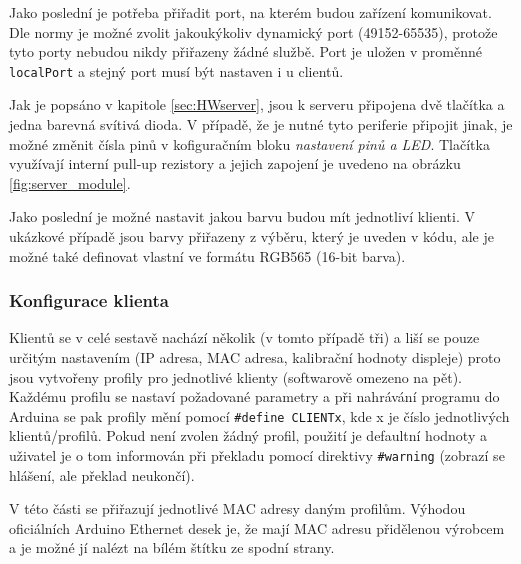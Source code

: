 Jako poslední je potřeba přiřadit port, na kterém budou zařízení komunikovat. Dle normy \cite{norm_RFC6335} je možné zvolit jakoukýkoliv dynamický port (49152-65535), protože tyto porty nebudou nikdy přiřazeny žádné službě. Port je uložen v proměnné \texttt{localPort} a stejný port musí být nastaven i u clientů.


Jak je popsáno v kapitole \ref{sec:HWserver}, jsou k serveru připojena dvě tlačítka a jedna barevná svítivá dioda. V případě, že je nutné tyto periferie připojit jinak, je možné změnit čísla pinů v kofiguračním bloku \textit{nastavení pinů a LED}. Tlačítka využívají interní pull-up rezistory a jejich zapojení je uvedeno na obrázku \ref{fig:server_module}.


Jako poslední je možné nastavit jakou barvu budou mít jednotliví klienti. V ukázkové případě jsou barvy přiřazeny z výběru, který je uveden v kódu, ale je možné také definovat vlastní ve formátu RGB565 (16-bit barva).


\subsubsection{Konfigurace klienta}
\label{sec:client-nastaveni}
Klientů se v celé sestavě nachází několik (v tomto případě tři) a liší se pouze určitým nastavením (IP adresa, MAC adresa, kalibrační hodnoty displeje) proto jsou vytvořeny profily pro jednotlivé klienty (softwarově omezeno na pět). Každému profilu se nastaví požadované parametry a při nahrávání programu do Arduina se pak profily mění pomocí \texttt{\#define CLIENTx}, kde x je číslo jednotlivých klientů/profilů. Pokud není zvolen žádný profil, použití je defaultní hodnoty a uživatel je o tom informován při překladu pomocí direktivy \texttt{\#warning} (zobrazí se hlášení, ale překlad neukončí).


V této části se přiřazují jednotlivé MAC adresy daným profilům. Výhodou oficiálních Arduino Ethernet desek je, že mají MAC adresu přidělenou výrobcem a je možné jí nalézt na bílém štítku ze spodní strany.


